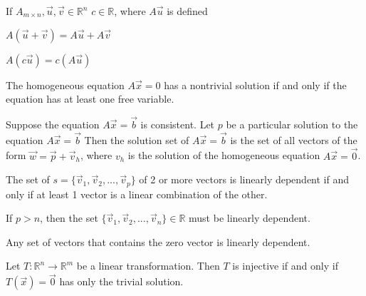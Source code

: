 \documentclass[5pt]{article}
\begin{document}
\begin{multicols}{2}
\begin{theorem}
  If $A_{m\times n},\vec{u},\vec{v}\in\mathbb{R}^n$ $c\in\mathbb{R}$, where $A\vec{u}$ is defined\\
  \begin{itemize*}
    \item $A(\vec{u}+\vec{v})=A\vec{u}+A\vec{v}$
    \item $A(c\vec{u})=c(A\vec{u})$
  \end{itemize*}
\end{theorem}

\begin{theorem}
  The homogeneous equation $A\vec{x}=0$ has a nontrivial solution if and only if the equation has at least
  one free variable.
\end{theorem}

\begin{theorem}
  Suppose the equation $A\vec{x}=\vec{b}$ is consistent. Let $p$ be a particular solution to the equation $A\vec{x}=\vec{b}$ 
  Then the solution set of $A\vec{x}=\vec{b}$ is the set of all vectors of the form $\vec{w}=\vec{p}+\vec{v}_h$,
  where $v_h$ is the solution of the homogeneous equation $A\vec{x}=\vec{0}$.
\end{theorem}

\begin{theorem}
  The set of  $s=\{\vec{v}_1,\vec{v}_2, ... ,\vec{v}_p\}$ of 2 or more vectors 
  is linearly dependent if and only if at least 1 vector is a linear combination 
  of the other.
\end{theorem}

\begin{theorem}
  If $p>n$, then the set $\{\vec{v}_1, \vec{v}_2, ..., \vec{v}_n\}\in\mathbb{R}$ 
  must be linearly dependent.
\end{theorem}

\begin{theorem}
  Any set of vectors that contains the zero vector is linearly dependent.
\end{theorem}

\begin{theorem}
  Let $T:\mathbb{R}^n\rightarrow\mathbb{R}^m$ be a linear transformation. Then $T$ 
  is injective if and only if $T(\vec{x})=\vec{0}$ has only the trivial solution.
\end{theorem}


\end{multicols}
\end{document}

